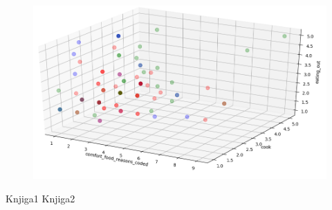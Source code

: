 \documentclass[12pt,a4paper]{article}
\begin{document}
\begin{figure}[H]
  \centering
  \includegraphics[width=15cm]{3dgrafik.png}
\end{figure}


\begin{thebibliography}{9}
  Knjiga1
  Knjiga2
\end{thebibliography}
\end{document}
